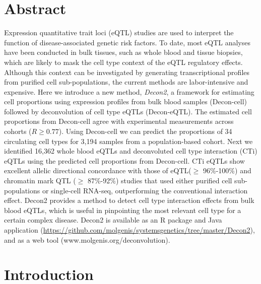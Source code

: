 \section*{Abstract}

Expression quantitative trait loci (eQTL) studies are used to interpret the function of disease-associated genetic risk factors. To date, most eQTL analyses have been conducted in bulk tissues, such as whole blood and tissue biopsies, which are likely to mask the cell type context of the eQTL regulatory effects. Although this context can be investigated by generating transcriptional profiles from purified cell sub-populations, the current methods are labor-intensive and expensive. Here we introduce a new method, \emph{Decon2}, a framework for estimating cell proportions using expression profiles from bulk blood samples (Decon-cell) followed by deconvolution of cell type eQTLs (Decon-eQTL). The estimated cell proportions from Decon-cell agree with experimental measurements across cohorts ($R \geq 0.77$). Using Decon-cell we can predict the proportions of 34 circulating cell types for 3,194 samples from a population-based cohort. Next we identified 16,362 whole blood eQTLs and deconvoluted cell type interaction (CTi) eQTLs using the predicted cell proportions from Decon-cell. CTi eQTLs show excellent allelic directional concordance with those of eQTL($\geq$ 96\%-100\%) and chromatin mark QTL ($\geq$ 87\%-92\%) studies that used either purified cell sub-populations or single-cell RNA-seq, outperforming the conventional interaction effect. Decon2 provides a method to detect cell type interaction effects from bulk blood eQTLs, which is useful in pinpointing the most relevant cell type for a certain complex disease. Decon2 is available as an R package and Java application (\url{https://github.com/molgenis/systemsgenetics/tree/master/Decon2}), and as a web tool (www.molgenis.org/deconvolution).


\section{Introduction}

